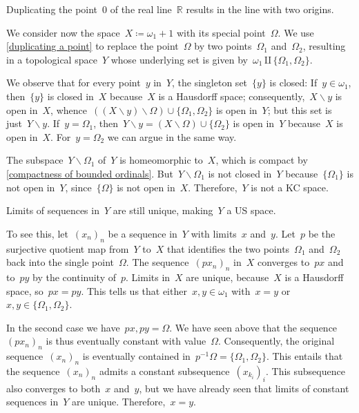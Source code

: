 \begin{example}
	Duplicating the point~$0$ of the real line~$ℝ$ results in the line with two origins.
\end{example}

We consider now the space~$X ≔ ω_1 + 1$ with its special point~$Ω$.
We use \cref{duplicating a point} to replace the point~$Ω$ by two points~$Ω_1$ and~$Ω_2$, resulting in a topological space~$Y$ whose underlying set is given by~$ω_1 ⨿ \{ Ω_1, Ω_2 \}$.

We observe that for every point~$y$ in~$Y$, the singleton set~$\{ y \}$ is closed:
If~$y ∈ ω_1$, then~$\{ y \}$ is closed in~$X$ because~$X$ is a Hausdorff space;
consequently,~$X ∖ y$ is open in~$X$, whence~$((X ∖ y) ∖ Ω) ∪ \{ Ω_1, Ω_2 \}$ is open in~$Y$;
but this set is just~$Y ∖ y$.
If~$y = Ω_1$, then~$Y ∖ y = (X ∖ Ω) ∪ \{ Ω_2 \}$ is open in~$Y$ because~$X$ is open in~$X$.
For~$y = Ω_2$ we can argue in the same way.

The subspace~$Y ∖ Ω_1$ of~$Y$ is homeomorphic to~$X$, which is compact by \cref{compactness of bounded ordinals}.
But~$Y ∖ Ω_1$ is not closed in~$Y$ because~$\{ Ω_1 \}$ is not open in~$Y$, since~$\{ Ω \}$ is not open in~$X$.
Therefore,~$Y$ is not a KC space.

Limits of sequences in~$Y$ are still unique, making~$Y$ a US space.

To see this, let~$(x_n)_n$ be a sequence in~$Y$ with limits~$x$ and~$y$.
Let~$p$ be the surjective quotient map from~$Y$ to~$X$ that identifies the two points~$Ω_1$ and~$Ω_2$ back into the single point~$Ω$.
The sequence~$(p x_n)_n$ in~$X$ converges to~$p x$ and to~$p y$ by the continuity of~$p$.
Limits in~$X$ are unique, because~$X$ is a Hausdorff space, so~$p x = p y$.
This tells us that either~$x, y ∈ ω_1$ with~$x = y$ or~$x, y ∈ \{ Ω_1, Ω_2 \}$.

In the second case we have~$p x, p y = Ω$.
We have seen above that the sequence~$(p x_n)_n$ is thus eventually constant with value~$Ω$.
Consequently, the original sequence~$(x_n)_n$ is eventually contained in~$p^{-1} Ω = \{ Ω_1, Ω_2 \}$.
This entails that the sequence~$(x_n)_n$ admits a constant subsequence~$(x_{k_i})_i$.
This subsequence also converges to both~$x$ and~$y$, but we have already seen that limits of constant sequences in~$Y$ are unique.
Therefore,~$x = y$.
